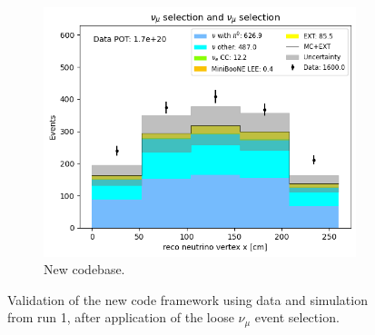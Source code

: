 \begin{figure}[H]
\begin{subfigure}[t]{0.32\linewidth}
        \includegraphics[width=\linewidth]{technote/Appendix_Validation/Figures/Numu/Run1_Vertex_X_Alex.png}
        \caption{New codebase.}
    \end{subfigure}
    \caption{Validation of the new code framework using data and simulation from run 1, after application of the loose $\nu_{\mu}$ event selection.}
\end{figure}

